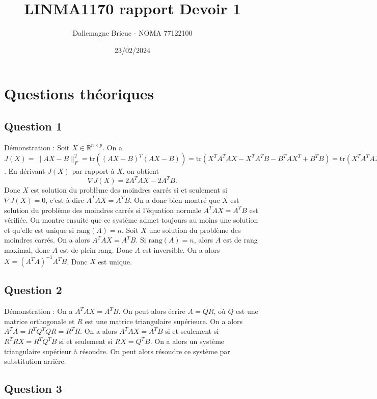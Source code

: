 \documentclass[11pt]{article}
\title{LINMA1170 rapport Devoir 1}
\author{Dallemagne Brieuc - NOMA 77122100}
\date{23/02/2024}
\begin{document}
\maketitle

\section{Questions théoriques}

\subsection{Question 1}

Démonstration : Soit \( X \in \mathbb{R}^{n \times p} \).
On a \( J(X) = \lVert AX - B \rVert^2_F = \text{tr}((AX - B)^T (AX - B)) =
\text{tr}(X^T A^T AX - X^T A^T B - B^T A X^T + B^T B) = \text{tr}(X^T A^T AX - 2X^T A^T B + B^T B) \). En dérivant \( J(X) \) par rapport à \( X \), 
on obtient
\[ \nabla J(X) = 2A^T AX - 2A^T B. \]
Donc \( X \) est solution du problème des moindres carrés si et seulement si \( \nabla J(X) = 0 \), c'est-à-dire \( A^T AX = A^T B \). On a donc bien montré que \( X \) est solution du problème des moindres carrés si l'équation normale \( A^T AX = A^T B \) est vérifiée. 
On montre ensuite que ce système admet toujours au moins une solution et qu'elle est unique si \( \text{rang}(A) = n \). 
\newline
Soit \( X \) une solution du problème des moindres carrés. On a alors \( A^T AX = A^T B \). Si \( \text{rang}(A) = n \), alors \( A \) est de rang maximal, donc \( A \) est de plein rang. Donc \( A \) est inversible. On a alors \( X = (A^T A)^{-1}A^T B \). Donc \( X \) est unique. 

\subsection{Question 2}

Démonstration : On a \( A^T AX = A^T B \). On peut alors écrire \( A = QR \), où \( Q \) est une matrice orthogonale et \( R \) est une matrice triangulaire supérieure.
On a alors \( A^T A = R^T Q^T QR = R^T R \). On a alors \( A^T AX = A^T B \) si et seulement si \( R^T RX = R^T Q^T B \) si et seulement si \( RX = Q^T B \). 
On a alors un système triangulaire supérieur à résoudre. On peut alors résoudre ce système par substitution arrière. 

\subsection{Question 3}
\end{document}
